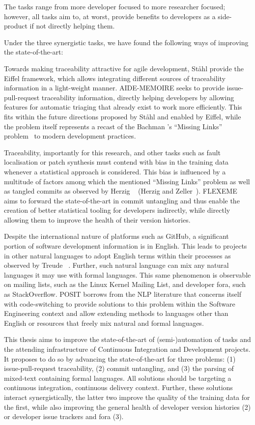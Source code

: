 The tasks range from more developer focused to more researcher focused; however,
all tasks aim to, at worst, provide benefits to developers as a side-product if
not directly helping them.

Under the three synergistic tasks, we have found the following ways of improving
the state-of-the-art:

Towards making traceability attractive for agile development, Ståhl \etal [2]
provide the Eiffel framework, which allows integrating different sources of
traceability information in a light-weight manner. AIDE-MEMOIRE seeks to provide
issue-pull-request traceability information, directly helping developers by
allowing features for automatic triaging that already exist to work more
efficiently. This fits within the future directions proposed by Ståhl \etal and
enabled by Eiffel, while the problem itself represents a recast of the Bachman
\etal’s “Missing Links” problem~\cite{MissingLinks} to modern development
practices. 

Traceability, importantly for this research, and other tasks such as fault
localisation or patch synthesis must contend with bias in the training data
whenever a statistical approach is considered. This bias is influenced by a
multitude of factors among which the mentioned “Missing Links” problem as well
as tangled commits as observed by Herzig \etal~\cite{Herzig2016} (Herzig and
Zeller~\cite{Herzig2013}). FLEXEME aims to forward the state-of-the-art in
commit untangling and thus enable the creation of better statistical tooling for
developers indirectly, while directly allowing them to improve the health of
their version histories. 

Despite the international nature of platforms such as GitHub, a significant
portion of software development information is in English. This leads to
projects in other natural languages to adopt English terms within their
processes as observed by Treude \etal~\cite{Treude2015portuguese}. Further, such
natural language can mix any natural languages it may use with formal languages.
This same phenomenon is observable on mailing lists, such as the Linux Kernel
Mailing List, and developer fora, such as StackOverflow. POSIT borrows from the
NLP literature that concerns itself with code-switching to provide solutions to
this problem within the Software Engineering context and allow extending methods
to languages other than English or resources that freely mix natural and formal
languages.

This thesis aims to improve the state-of-the-art of (semi-)automation of tasks
and the attending infrastructure of Continuous Integration and Development
projects. It proposes to do so by advancing the state-of-the-art for three
problems: (1) issue-pull-request traceability, (2) commit untangling, and (3)
the parsing of mixed-text containing formal languages. All solutions should be
targeting a continuous integration, continuous delivery context. Further, these
solutions interact synergistically, the latter two improve the quality of the
training data for the first, while also improving the general health of
developer version histories (2) or developer issue trackers and fora (3).

